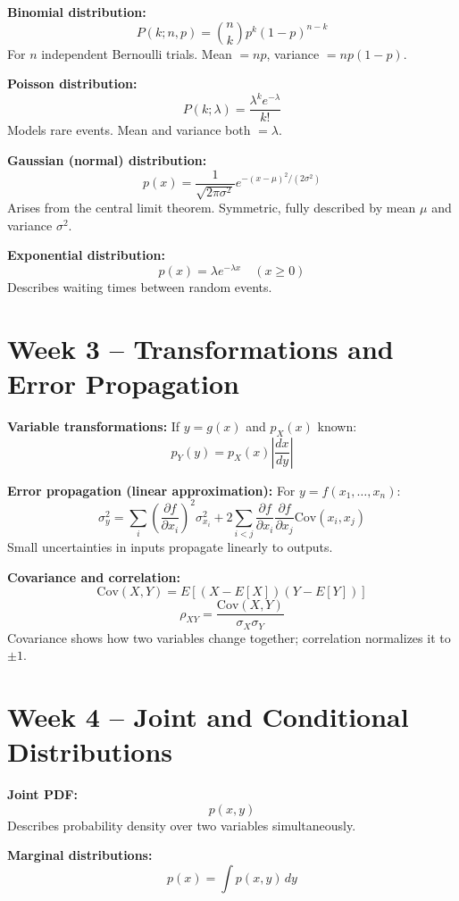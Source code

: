 \documentclass[11pt]{article}
\begin{document}
\textbf{Binomial distribution:}
\[
    P(k; n, p) = \binom{n}{k} p^k (1-p)^{n-k}
\]
For $n$ independent Bernoulli trials. Mean $= np$, variance $= np(1-p)$.

\textbf{Poisson distribution:}
\[
    P(k; \lambda) = \frac{\lambda^k e^{-\lambda}}{k!}
\]
Models rare events. Mean and variance both $= \lambda$.

\textbf{Gaussian (normal) distribution:}
\[
    p(x) = \frac{1}{\sqrt{2\pi\sigma^2}} e^{-(x - \mu)^2 / (2\sigma^2)}
\]
Arises from the central limit theorem. Symmetric, fully described by mean $\mu$ and variance $\sigma^2$.

\textbf{Exponential distribution:}
\[
    p(x) = \lambda e^{-\lambda x} \quad (x \ge 0)
\]
Describes waiting times between random events.

\section*{Week 3 – Transformations and Error Propagation}

\textbf{Variable transformations:}
If $y = g(x)$ and $p_X(x)$ known:
\[
    p_Y(y) = p_X(x) \left|\frac{dx}{dy}\right|
\]

\textbf{Error propagation (linear approximation):}
For $y = f(x_1, \dots, x_n)$:
\[
    \sigma_y^2 = \sum_i \left( \frac{\partial f}{\partial x_i} \right)^2 \sigma_{x_i}^2 + 2 \sum_{i<j} \frac{\partial f}{\partial x_i}\frac{\partial f}{\partial x_j} \mathrm{Cov}(x_i,x_j)
\]
Small uncertainties in inputs propagate linearly to outputs.

\textbf{Covariance and correlation:}
\[
    \mathrm{Cov}(X,Y) = E[(X - E[X])(Y - E[Y])]
\]
\[
    \rho_{XY} = \frac{\mathrm{Cov}(X,Y)}{\sigma_X \sigma_Y}
\]
Covariance shows how two variables change together; correlation normalizes it to $\pm 1$.

\section*{Week 4 – Joint and Conditional Distributions}

\textbf{Joint PDF:}
\[
    p(x,y)
\]
Describes probability density over two variables simultaneously.

\textbf{Marginal distributions:}
\[
    p(x) = \int p(x,y)\, dy
\]
\end{document}
